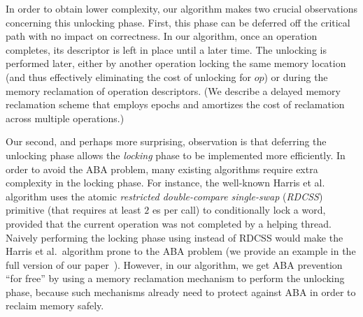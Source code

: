 
In order to obtain lower complexity, our algorithm makes two crucial observations concerning this unlocking phase. First, this phase can be deferred off the critical path with no impact on correctness. In our algorithm, once an \mcas{} operation completes, its descriptor is left in place until a later time. The unlocking is performed later, either 
by another \mcas{} operation locking the same memory location (and thus effectively eliminating the cost of unlocking for $op$) or during the memory reclamation of operation descriptors. (We describe a delayed memory reclamation scheme that employs epochs and amortizes the cost of reclamation across multiple operations.)


Our second, and perhaps more surprising, observation is that deferring the unlocking phase allows the \textit{locking} phase to be implemented more efficiently. In order to avoid the ABA problem, many existing algorithms require extra complexity in the locking phase. For instance, the well-known Harris et al.~\cite{harris02} algorithm uses the atomic \textit{restricted double-compare single-swap} (\textit{RDCSS}) primitive (that requires at least $2$ \cas{}es per call) to conditionally lock a word, provided that the current operation was not completed by a helping thread. Naively performing the locking phase using \cas{} instead of RDCSS would make the Harris et al.\ algorithm prone to the ABA problem (we provide an example in the full version of our paper~\cite{longversion}). However, in our algorithm, we get ABA prevention ``for free'' by using a memory reclamation mechanism to perform the unlocking phase, because such mechanisms already need to protect against ABA in order to reclaim memory safely. 

